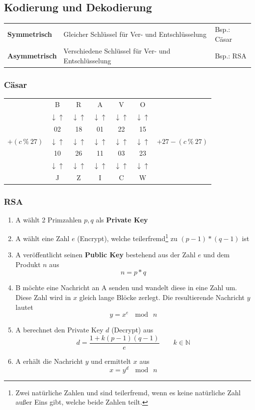 \documentclass{school}
\begin{document}
\subsection{Kodierung und Dekodierung}
\begin{tabular}{l l l}
    \textbf{Symmetrisch} & Gleicher Schlüssel für Ver- und Entschlüsselung & Bsp.: Cäsar \\
    \textbf{Asymmetrisch} & Verschiedene Schlüssel für Ver- und Entschlüsselung & Bsp.: RSA
\end{tabular}

\subsubsection{Cäsar}
\begin{center}
    \begin{tabular}{r c c c c c l}
        & B & R & A & V & O &\\
        & $\downarrow \uparrow$ & $\downarrow \uparrow$ & $\downarrow \uparrow$ & $\downarrow \uparrow$ & $\downarrow \uparrow$ &\\
        & 02 & 18 & 01 & 22 & 15 &\\
        $+ (c ~\%~ 27)$ & $\downarrow \uparrow$ & $\downarrow \uparrow$ & $\downarrow \uparrow$ & $\downarrow \uparrow$ & $\downarrow \uparrow$ & $+ 27 - (c ~\%~ 27)$\\
        & 10 & 26 & 11 & 03 & 23 &\\
        & $\downarrow \uparrow$ & $\downarrow \uparrow$ & $\downarrow \uparrow$ & $\downarrow \uparrow$ & $\downarrow \uparrow$ &\\
        & J & Z & I & C & W &
    \end{tabular}
\end{center}

\subsubsection{RSA}
\begin{enumerate}
    \item A wählt 2 Primzahlen $p, q$ als \textbf{Private Key}
    \item A wählt eine Zahl $e$ (Encrypt), welche teilerfremd\footnote{Zwei natürliche Zahlen und sind teilerfremd, wenn es keine natürliche Zahl außer Eins gibt, welche beide Zahlen teilt.} zu $(p-1)*(q-1)$ ist
    \item A veröffentlicht seinen \textbf{Public Key} bestehend aus der Zahl $e$ und dem Produkt $n$ aus $$n = p * q$$
    \item B möchte eine Nachricht an A senden und wandelt diese in eine Zahl um. Diese Zahl wird in $x$ gleich lange Blöcke zerlegt. Die resultierende Nachricht $y$ lautet $$y = x^e ~\mod~ n$$
    \item A berechnet den Private Key $d$ (Decrypt) aus $$d = \frac{1 + k(p-1)(q-1)}{e} \quad\quad k \in \mathbb{N}$$
    \item A erhält die Nachricht $y$ und ermittelt $x$ aus $$x = y^d ~\mod~ n$$
\end{enumerate}
\end{document}
